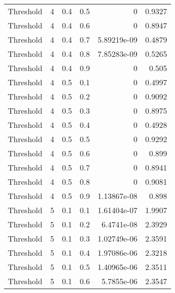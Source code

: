 \documentclass{article}
\begin{document}
\begin{longtable}[H]{lrrrrr}
 Threshold      &       4 &   0.4 &            0.5 &      0           &          0.9327 \\
 Threshold      &       4 &   0.4 &            0.6 &      0           &          0.8947 \\
 Threshold      &       4 &   0.4 &            0.7 &      5.89219e-09 &          0.4879 \\
 Threshold      &       4 &   0.4 &            0.8 &      7.85283e-09 &          0.5265 \\
 Threshold      &       4 &   0.4 &            0.9 &      0           &          0.505  \\
 Threshold      &       4 &   0.5 &            0.1 &      0           &          0.4997 \\
 Threshold      &       4 &   0.5 &            0.2 &      0           &          0.9092 \\
 Threshold      &       4 &   0.5 &            0.3 &      0           &          0.8975 \\
 Threshold      &       4 &   0.5 &            0.4 &      0           &          0.4928 \\
 Threshold      &       4 &   0.5 &            0.5 &      0           &          0.9292 \\
 Threshold      &       4 &   0.5 &            0.6 &      0           &          0.899  \\
 Threshold      &       4 &   0.5 &            0.7 &      0           &          0.8941 \\
 Threshold      &       4 &   0.5 &            0.8 &      0           &          0.9081 \\
 Threshold      &       4 &   0.5 &            0.9 &      1.13867e-08 &          0.898  \\
 Threshold      &       5 &   0.1 &            0.1 &      1.61404e-07 &          1.9907 \\
 Threshold      &       5 &   0.1 &            0.2 &      6.4741e-08  &          2.3929 \\
 Threshold      &       5 &   0.1 &            0.3 &      1.02749e-06 &          2.3591 \\
 Threshold      &       5 &   0.1 &            0.4 &      1.97086e-06 &          2.3218 \\
 Threshold      &       5 &   0.1 &            0.5 &      1.40965e-06 &          2.3511 \\
 Threshold      &       5 &   0.1 &            0.6 &      5.7855e-06  &          2.3547 \\

\end{longtable}
\end{document}
